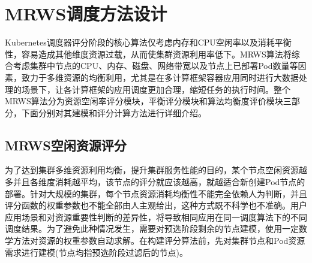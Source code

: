 \section{MRWS调度方法设计}
Kubernetes调度器评分阶段的核心算法仅考虑内存和CPU空闲率以及消耗平衡性，容易造成其他维度资源过载，从而使集群资源利用率低下。MRWS算法将综合考虑集群中节点的CPU、内存、磁盘、网络带宽以及节点上已部署Pod数量等因素，致力于多维资源的均衡利用，尤其是在多计算框架容器应用同时进行大数据处理的场景下，让各计算框架的应用调度更加合理，缩短任务的执行时间。整个MRWS算法分为资源空闲率评分模块，平衡评分模块和算法均衡度评价模块三部分，下面分别对其建模和评分计算方法进行详细介绍。

\subsection{MRWS空闲资源评分}
为了达到集群多维资源利用均衡，提升集群服务性能的目的，某个节点空闲资源越多并且各维度消耗越平均，该节点的评分就应该越高，就越适合新创建Pod节点的部署。针对大规模的集群，每个节点资源消耗均衡性不能完全依赖人为判断，并且评分函数的权重参数也不能全部由人主观给出，这种方式既不科学也不准确。用户应用场景和对资源重要性判断的差异性，将导致相同应用在同一调度算法下的不同调度结果。为了避免此种情况发生，需要对预选阶段剩余的节点建模，使用一定数学方法对资源的权重参数自动求解。在构建评分算法前，先对集群节点和Pod资源需求进行建模(节点均指预选阶段过滤后的节点)。
